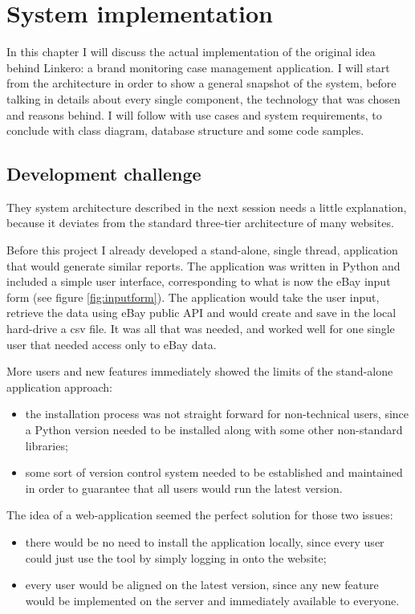 \chapter{System implementation}

In this chapter I will discuss the actual implementation of the original idea
behind Linkero: a brand monitoring case management application. I will start
from the architecture in order to show a general snapshot of the system, before
talking in details about every single component, the technology that was
chosen and reasons behind. I will follow with use cases and
system requirements, to conclude with class diagram, database structure and some
code samples.

\section{Development challenge}
They system architecture described in the next session needs a little
explanation, because it deviates from the standard three-tier architecture of
many websites.

Before this project I already developed a stand-alone, single thread,
application that would generate similar reports. The application was written in
Python and included a simple user interface, corresponding to what is now the
eBay input form (see figure \ref{fig:inputform}). The application would take the
user input, retrieve the data using eBay public API and would create and save in
the local hard-drive a csv file. It was all that was needed, and worked well for
one single user that needed access only to eBay data.

More users and new features immediately showed the limits of the stand-alone
application approach:
\begin{itemize}
  \item the installation process was not straight forward for non-technical
  users, since a Python version needed to be installed along with some other
  non-standard libraries;
  \item some sort of version control system needed to be established and
  maintained in order to guarantee that all users would run the latest version.
\end{itemize}

The idea of a web-application seemed the perfect solution for those two issues:
\begin{itemize}
  \item there would be no need to install the application locally, since every
  user could just use the tool by simply logging in onto the website;
  \item every user would be aligned on the latest version, since any new
  feature would be implemented on the server and immediately available to
  everyone.
\end{itemize}

